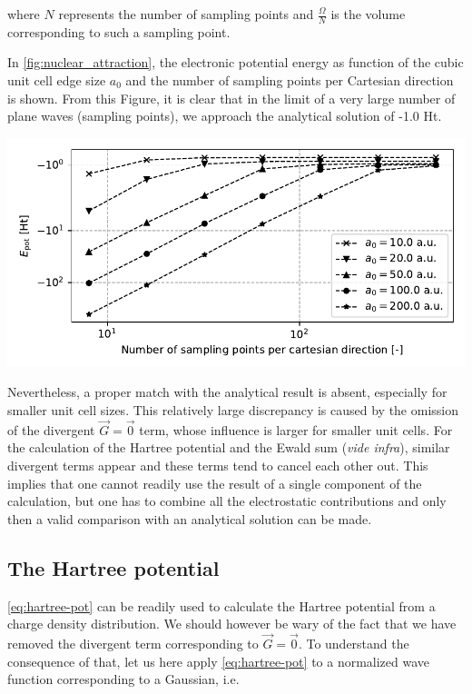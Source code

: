where $N$ represents the number of sampling points and $\frac{\Omega}{N}$ is the volume corresponding to such a sampling point.

In \cref{fig:nuclear_attraction}, the electronic potential energy as function of the cubic unit cell edge size $a_{0}$ and the number of sampling points per Cartesian direction is shown. From this Figure, it is clear that in the limit of a very large number of plane waves (sampling points), we approach the analytical solution of -1.0 Ht.

\begin{Figure}
    \centering
    \includegraphics[width=\linewidth]{img/nuclear_attraction.pdf}
    \label{fig:nuclear_attraction}
\end{Figure}

Nevertheless, a proper match with the analytical result is absent, especially for smaller unit cell sizes. This relatively large discrepancy is caused by the omission of the divergent $\vec{G}=\vec{0}$ term, whose influence is larger for smaller unit cells. For the calculation of the Hartree potential and the Ewald sum (\textit{vide infra}), similar divergent terms appear and these terms tend to cancel each other out. This implies that one cannot readily use the result of a single component of the calculation, but one has to combine all the electrostatic contributions and only then a valid comparison with an analytical solution can be made.

%
%
%
\subsection{The Hartree potential}

\cref{eq:hartree-pot} can be readily used to calculate the Hartree potential from a charge density distribution. We should however be wary of the fact that we have removed the divergent term corresponding to $\vec{G} = \vec{0}$. To understand the consequence of that, let us here apply \cref{eq:hartree-pot} to a normalized wave function corresponding to a Gaussian, i.e.

